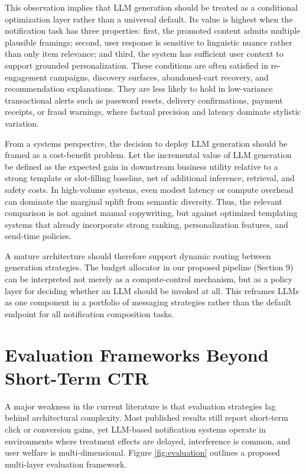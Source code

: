 \documentclass[sigconf]{acmart}
\begin{document}
This observation implies that LLM generation should be treated as a conditional optimization layer rather than a universal default. Its value is highest when the notification task has three properties: first, the promoted content admits multiple plausible framings; second, user response is sensitive to linguistic nuance rather than only item relevance; and third, the system has sufficient user context to support grounded personalization. These conditions are often satisfied in re-engagement campaigns, discovery surfaces, abandoned-cart recovery, and recommendation explanations. They are less likely to hold in low-variance transactional alerts such as password resets, delivery confirmations, payment receipts, or fraud warnings, where factual precision and latency dominate stylistic variation.

From a systems perspective, the decision to deploy LLM generation should be framed as a cost-benefit problem. Let the incremental value of LLM generation be defined as the expected gain in downstream business utility relative to a strong template or slot-filling baseline, net of additional inference, retrieval, and safety costs. In high-volume systems, even modest latency or compute overhead can dominate the marginal uplift from semantic diversity. Thus, the relevant comparison is not against manual copywriting, but against optimized templating systems that already incorporate strong ranking, personalization features, and send-time policies.

A mature architecture should therefore support dynamic routing between generation strategies. The budget allocator in our proposed pipeline (Section 9) can be interpreted not merely as a compute-control mechanism, but as a policy layer for deciding whether an LLM should be invoked at all. This reframes LLMs as one component in a portfolio of messaging strategies rather than the default endpoint for all notification composition tasks.

\section{Evaluation Frameworks Beyond Short-Term CTR}

A major weakness in the current literature is that evaluation strategies lag behind architectural complexity. Most published results still report short-term click or conversion gains, yet LLM-based notification systems operate in environments where treatment effects are delayed, interference is common, and user welfare is multi-dimensional. Figure \ref{fig:evaluation} outlines a proposed multi-layer evaluation framework.
\end{document}
